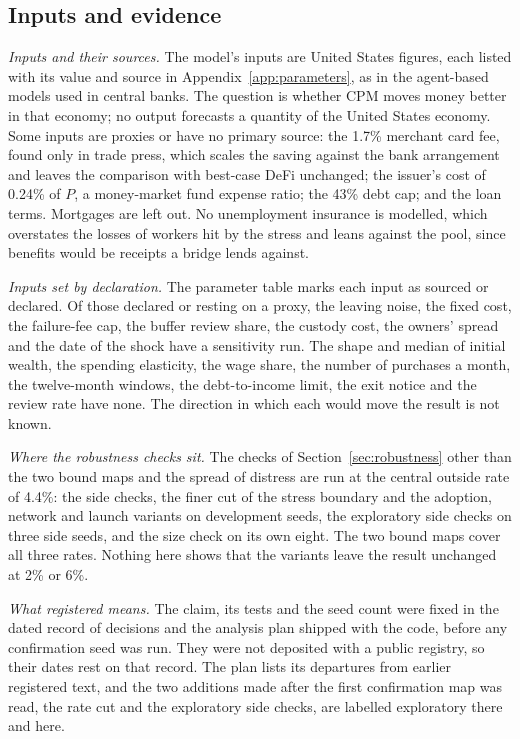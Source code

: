 \subsection{Inputs and evidence}

\emph{Inputs and their sources.} The model's inputs are United States figures, each listed with its value and
source in Appendix~\ref{app:parameters}, as in the agent-based models used in central banks. The question is
whether CPM moves money better in that economy; no output forecasts a quantity of the United States economy. Some
inputs are proxies or have no primary source: the 1.7\% merchant card fee, found only in trade
press, which scales the saving against the bank arrangement and leaves the comparison with best-case DeFi unchanged;
the issuer's cost of 0.24\% of $P$, a money-market fund expense ratio; the 43\% debt cap; and the loan terms.
Mortgages are left out. No unemployment insurance is modelled, which overstates the losses of workers hit by the
stress and leans against the pool, since benefits would be receipts a bridge lends against.

\emph{Inputs set by declaration.} The parameter table marks each input as sourced or declared. Of those
declared or resting on a proxy, the leaving noise, the fixed cost, the failure-fee cap, the buffer review share, the
custody cost, the owners' spread and the date of the shock have a sensitivity run. The shape and median of initial wealth, the
spending elasticity, the wage share, the number of purchases a month, the twelve-month windows, the debt-to-income
limit, the exit notice and the review rate have none. The direction in which each would move the result is not
known.

\emph{Where the robustness checks sit.} The checks of Section~\ref{sec:robustness} other than the two bound maps and
the spread of distress are run at the central outside rate of 4.4\%: the side checks, the finer cut of the stress
boundary and the adoption, network and launch variants on development seeds, the exploratory side checks on three
side seeds, and the size check on its own eight. The two bound maps cover all three rates. Nothing here shows that the variants
leave the result unchanged at 2\% or 6\%.

\emph{What registered means.} The claim, its tests and the seed count were fixed in the dated record of decisions
and the analysis plan shipped with the code, before any confirmation seed was run. They were not deposited with a
public registry, so their dates rest on that record. The plan lists its departures from earlier registered
text, and the two additions made after the first confirmation map was read, the rate cut and the exploratory side
checks, are labelled exploratory there and here.

